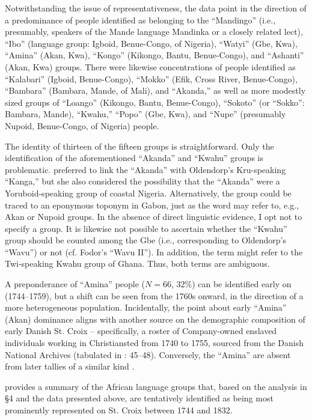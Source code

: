 \documentclass[output=paper,colorlinks,citecolor=brown]{langscibook}
\begin{document}
Notwithstanding the issue of representativeness, the data point in the direction of a predominance of people identified as belonging to the ``Mandingo'' (i.e., presumably, speakers of the Mande language Mandinka or a closely related lect), ``Ibo'' (language group: Igboid, Benue-Congo, of Nigeria), ``Watyi'' (Gbe, Kwa), ``Amina'' (Akan, Kwa), ``Kongo'' (Kikongo, Bantu, Benue-Congo), and ``Ashanti'' (Akan, Kwa) groups. There were likewise concentrations of people identified as “Kalabari” (Igboid, Benue-Congo), ``Mokko'' (Efik, Cross River, Benue-Congo), ``Bambara'' (Bambara, Mande, of Mali), and ``Akanda,'' as well as more modestly sized groups of ``Loango'' (Kikongo, Bantu, Benue-Congo), ``Sokoto'' (or ``Sokko'': Bambara, Mande), ``Kwahu,'' ``Popo'' (Gbe, Kwa), and ``Nupe'' (presumably Nupoid, Benue-Congo, of Nigeria) people.

The identity of thirteen of the fifteen groups is straightforward. Only the identification of the aforementioned ``Akanda'' and ``Kwahu'' groups is problematic. \citet[25]{Pope_1970} preferred to link the ``Akanda'' with Oldendorp’s Kru-speaking ``Kanga,'' but she also considered the possibility that the ``Akanda'' were a Yoruboid-speaking group of coastal Nigeria. Alternatively, the group could be traced to an eponymous toponym in Gabon, just as the word may refer to, e.g., Akan or Nupoid groups. In the absence of direct linguistic evidence, I opt not to specify a group. It is likewise not possible to ascertain whether the ``Kwahu'' group should be counted among the Gbe (i.e., corresponding to Oldendorp's ``Wavu'') or not (cf. Fodor's \citeyear{Fodor_1975} ``Wavu II''). In addition, the term might refer to the Twi-speaking Kwahu group of Ghana. Thus, both terms are ambiguous.

A preponderance of ``Amina'' people ($N=66$, 32\%) can be identified early on (1744–1759), but a shift can be seen from the 1760s onward, in the direction of a more heterogeneous population. Incidentally, the point about early “Amina” (Akan) dominance aligns with another source on the demographic composition of early Danish St. Croix – specifically, a roster of Company-owned enslaved individuals working in Christiansted from 1740 to 1755, sourced from the Danish National Archives (tabulated in \cite{Tyson_2011}: 45–48). Conversely, the ``Amina'' are absent from later tallies of a similar kind \citep[e.g.,][36]{Holsoe_1994}.

 provides a summary of the African language groups that, based on the analysis in §4 and the data presented above, are tentatively identified as being most prominently represented on St. Croix between 1744 and 1832.
\end{document}
